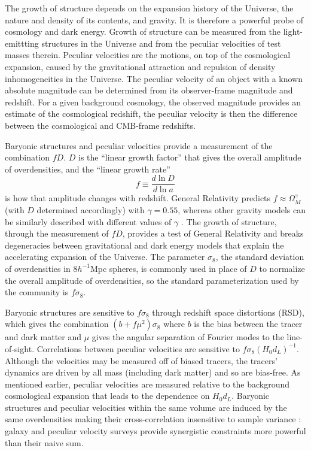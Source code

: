 \documentclass{aastex62}   	%
\begin{document}
The growth of structure depends on the expansion history of the Universe, the nature and density of its contents, and gravity. 
It is therefore a powerful probe of cosmology and dark energy.  Growth of structure can be measured from the light-emittting structures
in the Universe and from the peculiar velocities of test masses therein.
Peculiar velocities are the motions, on top of the cosmological expansion, caused by the gravitational attraction
and repulsion of density inhomogeneities in the Universe.  The peculiar velocity of an object with a known absolute magnitude
can be determined from its observer-frame magnitude and redshift. For a given background cosmology, the observed magnitude provides
an estimate of the cosmological redshift, the peculiar velocity is then the difference between the cosmological and CMB-frame redshifts.

Baryonic structures and peculiar velocities  provide a measurement of the combination $fD$.  $D$ is the ``linear growth factor'' that
gives the overall amplitude of  overdensities, and the ``linear growth rate''
$$f \equiv \frac{d\ln{D}}{d\ln{a}}$$ is how that amplitude changes with redshift.  General Relativity predicts
$f \approx \Omega_M^\gamma$ (with $D$ determined accordingly) with $\gamma=0.55$, whereas other gravity models can be similarly described
with different values of $\gamma$
\citep{2007APh....28..481L}.  The growth of structure, through the measurement of $fD$, provides a test of General Relativity and breaks degeneracies
between gravitational and dark energy models that explain the accelerating expansion of the Universe.
The parameter $\sigma_8$, the  standard deviation of overdensities in 8$h^{-1}$Mpc spheres, is 
commonly used in place of $D$ to normalize the
overall amplitude of  overdensities, so the standard parameterization used by the community is $f\sigma_8$.

Baryonic structures are sensitive to $f\sigma_8$ through redshift space distortions (RSD), 
which gives the combination $(b + f \mu^2)\sigma_8$ where $b$ is the bias between the tracer and dark matter
and $\mu$ gives the angular separation of Fourier modes to the line-of-sight.  Correlations between peculiar velocities are sensitive to  $f\sigma_8 (H_0 d_L)^{-1}$.
Although the velocities may be measured off of biased tracers, the tracers' dynamics are driven by all mass (including dark matter) and so are bias-free.
As
mentioned earlier, peculiar velocities are measured relative to the background cosmological expansion that
leads to the dependence on $H_0 d_L$. 
Baryonic structures and peculiar velocities within the same volume are induced by the same overdensities  making their cross-correlation 
insensitive to sample variance \citep{2007PhRvL..99h1301G}: galaxy and peculiar velocity surveys provide synergistic constraints more powerful
than their naive sum.
\end{document}
